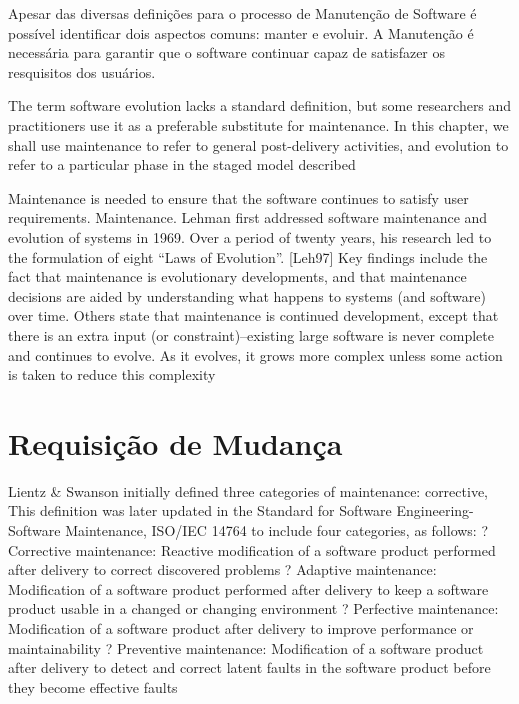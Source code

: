 Apesar das diversas definições para o processo de Manutenção de Software é possível identificar dois
aspectos comuns: manter e evoluir. A Manutenção é necessária para garantir que o software continuar
capaz de satisfazer os resquisitos dos usuários. 

The term software evolution lacks a standard definition, but some researchers and practitioners use
it as a preferable substitute for maintenance. In this chapter, we shall use maintenance to refer to
general post-delivery activities, and evolution to refer to a particular phase in the staged model
described

Maintenance is needed to ensure that the software continues
to satisfy user requirements. Maintenance. Lehman first addressed software maintenance and evolution of systems in 1969. Over a period of twenty years, his research led to the formulation of eight “Laws of Evolution”. [Leh97] Key findings
include the fact that maintenance is
evolutionary developments, and that
maintenance decisions are aided by understanding what happens to systems (and software) over time.
Others state that maintenance is continued development, except that there is
an extra input (or constraint)–existing large
software is never complete and continues to evolve. As it evolves, it grows more complex unless some
action is taken to reduce this complexity


\section{Requisição de Mudança}
\label{sec:requisição_de_mudanca}
Lientz \& Swanson initially defined three categories of maintenance: corrective,
This definition was later updated in the Standard for Software Engineering-Software Maintenance,
ISO/IEC 14764 to include four categories, as follows:
? Corrective maintenance: Reactive modification of a software product performed after delivery to
correct discovered problems
? Adaptive maintenance: Modification of a software product performed after delivery to keep a
software product
usable in a changed or changing environment
? Perfective maintenance: Modification of a software product after delivery to improve performance
or maintainability
? Preventive maintenance: Modification of a software product after delivery to detect and correct
latent
faults in the software product before they become effective faults


